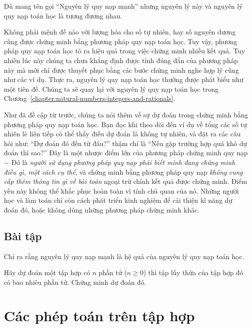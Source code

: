 Dù mang tên gọi ``Nguyên lý quy nạp mạnh'' nhưng nguyên lý này và nguyên lý quy nạp toán học là tương đương nhau.

Không phải mệnh đề nào với lượng hóa cho số tự nhiên, hay số nguyên dương cũng được chứng minh bằng phương pháp quy nạp toán học.  Tuy vậy, phương pháp quy nạp toán học tỏ ra hiệu quả trong việc chứng minh nhiều kết quả. Tuy nhiên lúc này chúng ta chưa khẳng định được tính đúng đắn của phương pháp này mà mới chỉ được thuyết phục bằng các bước chứng minh nghe hợp lý cũng như các ví dụ. Thực ra, nguyên lý quy nạp toán học thường được phát biểu như một tiên đề. Chúng ta sẽ quay lại với nguyên lý quy nạp toán học trong Chương~\ref{chapter:natural-numbers-integers-and-rationals}.

Như đã đề cập từ trước, chúng ta nói thêm về sự dự đoán trong chứng minh bằng phương pháp quy nạp toán học. Bạn đọc khi theo dõi đến ví dụ về tổng các số tự nhiên lẻ liên tiếp có thể thấy điều dự đoán là không tự nhiên, và đặt ra các câu hỏi như: ``Dự đoán đó đến từ đâu?\@'' thậm chí là ``Nếu gặp trường hợp quá khó dự đoán thì sao?\@'' Đây là một nhược điểm lớn của phương pháp chứng minh quy nạp $-$ Đó là \textit{người sử dụng phương pháp quy nạp phải biết mình đang chứng minh điều gì, một cách cụ thể}, và chứng minh bằng phương pháp quy nạp \textit{không cung cấp thêm thông tin gì về bài toán} ngoại trừ chính kết quả được chứng minh. Điểm yếu này không thể khắc phục hoàn toàn vì tính chủ quan của nó. Những người học và làm toán chỉ còn cách phát triển kinh nghiệm để cải thiện kĩ năng dự đoán đó, hoặc không dùng những phương pháp chứng minh khác.

\subsection{Bài tập}
\setcounter{exercise}{0}

\begin{exercise}
    Chỉ ra rằng nguyên lý quy nạp mạnh là hệ quả của nguyên lý quy nạp toán học.
\end{exercise}

\begin{exercise}
    Hãy dự đoán một tập hợp có $n$ phần tử ($n\geq 0$) thì tập lũy thừa của tập hợp đó có bao nhiêu phần tử. Chứng minh dự đoán đó.
\end{exercise}

\section{Các phép toán trên tập hợp}

